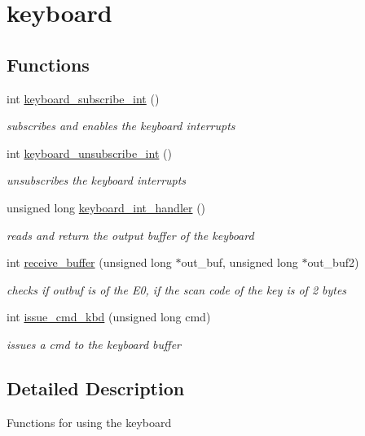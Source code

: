 \hypertarget{group__keyboard}{}\section{keyboard}
\label{group__keyboard}
\subsection*{Functions}
\begin{DoxyCompactItemize}
\item 
int \hyperlink{group__keyboard_ga4ac76b0a9a73670254d5fd4c520e458f}{keyboard\+\_\+subscribe\+\_\+int} ()
\begin{DoxyCompactList}\small\item\em subscribes and enables the keyboard interrupts \end{DoxyCompactList}\item 
int \hyperlink{group__keyboard_gac95aea27a5e91b363b876fed881f368f}{keyboard\+\_\+unsubscribe\+\_\+int} ()
\begin{DoxyCompactList}\small\item\em unsubscribes the keyboard interrupts \end{DoxyCompactList}\item 
unsigned long \hyperlink{group__keyboard_ga2c87019aa101479f492115ffe8f96235}{keyboard\+\_\+int\+\_\+handler} ()
\begin{DoxyCompactList}\small\item\em reads and return the output buffer of the keyboard \end{DoxyCompactList}\item 
int \hyperlink{group__keyboard_ga72afc248bb5895d6948f7a0247291411}{receive\+\_\+buffer} (unsigned long $\ast$out\+\_\+buf, unsigned long $\ast$out\+\_\+buf2)
\begin{DoxyCompactList}\small\item\em checks if outbuf is of the E0, if the scan code of the key is of 2 bytes \end{DoxyCompactList}\item 
int \hyperlink{group__keyboard_ga457cc5ca7ab01851bb8fcc8edfaba776}{issue\+\_\+cmd\+\_\+kbd} (unsigned long cmd)
\begin{DoxyCompactList}\small\item\em issues a cmd to the keyboard buffer \end{DoxyCompactList}\end{DoxyCompactItemize}


\subsection{Detailed Description}
Functions for using the keyboard 

